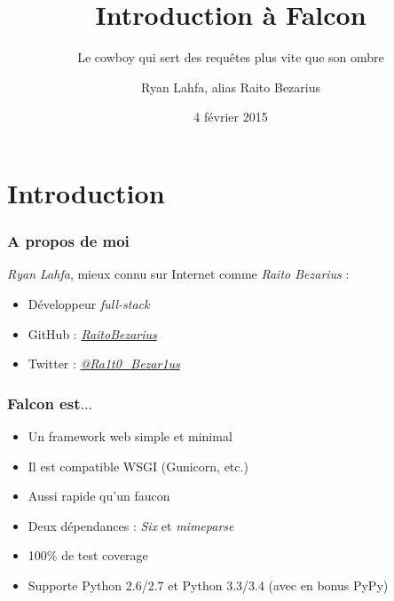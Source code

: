 \documentclass[10pt, compress]{beamer}
\title{Introduction à Falcon}
\subtitle{Le cowboy qui sert des requêtes plus vite que son ombre}
\date{4 février 2015}
\author{Ryan Lahfa, alias Raito Bezarius}
\institute{masterancpp@gmail.com}
\begin{document}
\maketitle

\section{Introduction}
\begin{frame}[fragile]
  \frametitle{A propos de moi}
  \emph{Ryan Lahfa}, mieux connu sur Internet comme \emph{Raito Bezarius} :
  \pause
  \begin{itemize}[<+->]
  	\item Développeur \emph{full-stack}
    \item GitHub : \emph{\href{http://github.com/RaitoBezarius}{RaitoBezarius}}
    \item Twitter : \emph{\href{http://twitter.com/Ra1t0\_Bezar1us}{@Ra1t0\_Bezar1us}}
  \end{itemize}
\end{frame}


\begin{frame}[fragile]
	\frametitle{Falcon est$\ldots$}
	\pause
	\begin{itemize}[<+->]
    	\item Un framework web \alert{simple} et \alert{minimal}
        \item Il est \alert{compatible} WSGI (Gunicorn, etc.)
        \item \alert{Aussi rapide qu'un faucon}
        \item \alert{Deux} dépendances : \emph{Six} et \emph{mimeparse}
        \item \alert{100\%} de test coverage
        \item Supporte \alert{Python 2.6/2.7} et \alert{Python 3.3/3.4} (avec en bonus \alert{PyPy})
     \end{itemize}
\end{frame}

\end{document}
